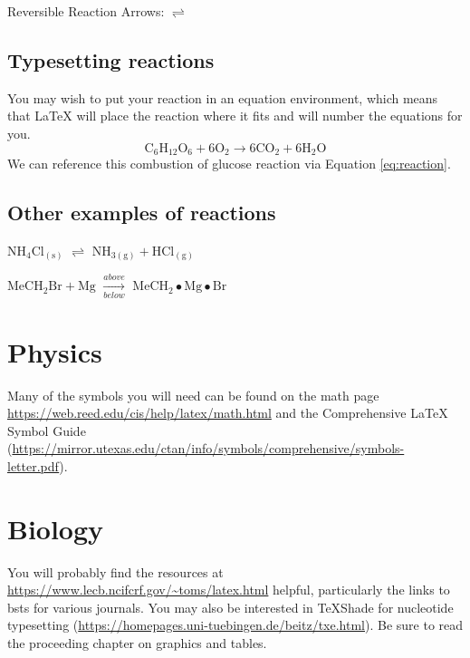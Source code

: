 \documentclass[12pt,twoside]{reedthesis}
\begin{document}
\noindent Reversible Reaction Arrows: \(\rightleftharpoons\)

\hypertarget{typesetting-reactions}{%
\subsection{Typesetting reactions}\label{typesetting-reactions}}

You may wish to put your reaction in an equation environment, which means that LaTeX will place the reaction where it fits and will number the equations for you.
\begin{equation}
  \mathrm{C_6H_{12}O_6  + 6O_2} \longrightarrow \mathrm{6CO_2 + 6H_2O}
  \label{eq:reaction}
\end{equation}
We can reference this combustion of glucose reaction via Equation \eqref{eq:reaction}.

\hypertarget{other-examples-of-reactions}{%
\subsection{Other examples of reactions}\label{other-examples-of-reactions}}

\(\mathrm{NH_4Cl_{(s)}}\) \(\rightleftharpoons\) \(\mathrm{NH_{3(g)}+HCl_{(g)}}\)

\noindent \(\mathrm{MeCH_2Br + Mg}\) \(\xrightarrow[below]{above}\) \(\mathrm{MeCH_2\bullet Mg \bullet Br}\)

\hypertarget{physics}{%
\section{Physics}\label{physics}}

Many of the symbols you will need can be found on the math page \url{https://web.reed.edu/cis/help/latex/math.html} and the Comprehensive LaTeX Symbol Guide (\url{https://mirror.utexas.edu/ctan/info/symbols/comprehensive/symbols-letter.pdf}).

\hypertarget{biology}{%
\section{Biology}\label{biology}}

You will probably find the resources at \url{https://www.lecb.ncifcrf.gov/~toms/latex.html} helpful, particularly the links to bsts for various journals. You may also be interested in TeXShade for nucleotide typesetting (\url{https://homepages.uni-tuebingen.de/beitz/txe.html}). Be sure to read the proceeding chapter on graphics and tables.
\end{document}
